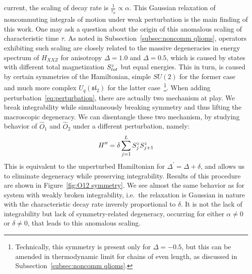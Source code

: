 current, the scaling of decay rate is \(\frac{1}{\tau_{\mu}} \propto \alpha\). This Gaussian relaxation
of noncommuting integrals of motion under weak perturbation is the main finding of this work.
One may ask a question about the origin of this anomalous scaling of characteristic time
\(\tau\). As noted in Subsection~\ref{subsec:noncomm qlioms}, operators exhibiting such scaling
are closely related to the massive degeneracies in energy spectrum of \(H_{XXZ}\) for
anisotropy  \(\Delta=1.0\) and \(\Delta = 0.5\), which is caused by states with
different total magnetization \(S^{z}_{tot}\) but
equal energies. This in turn, is caused by certain symmetries of the Hamiltonian, simple \(SU(2)\) for
the former case and much more complex \(U_q(\mathfrak{sl}_2)\) for the latter 
case~\footnote{Technically, this symmetry is present only for \(\Delta=-0.5\), but this
can be amended in thermodynamic limit for chains of even length, as discussed in 
Subsection~\ref{subsec:noncomm qlioms}. }. 
When adding perturbation~\eqref{eq:perturbation}, there are actually two mechanism at play. We break
integrability while simultaneously breaking symmetry and thus lifting the macroscopic degeneracy.
We can disentangle these two mechanism, by studying behavior of \(\hat{O}_1\) and \(\hat{O}_2\)
under a different perturbation, namely:
\begin{equation}
  H^{\prime\prime} = \delta \sum_{j=1}^{L} S^{z}_j S^{z}_{j+1}
\end{equation}
This is equivalent to the unperturbed Hamiltonian for \(\Delta^{\prime} = \Delta + \delta\),
and allows us to eliminate degeneracy while preserving integrability. Results of this procedure
are shown in Figure~\ref{fig:O12 symmetry}. We see almost the same behavior as for system
with weakly broken integrability, i.e.\ the relaxation is Gaussian in nature with the
characteristic decay rate inversly proportional to \(\delta\). It is not the lack of
integrability but lack of symmetry-related degeneracy, occurring for either \(\alpha\neq 0\)
or \(\delta\neq 0\), that leads to this anomalous scaling.
